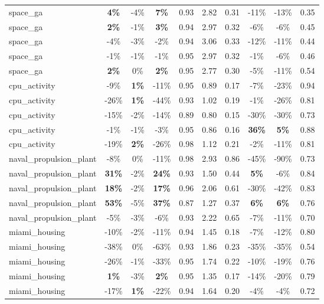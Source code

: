 \begin{table}[!htbp]
\begin{small}
\begin{sc}
{\begin{tabular}{lccccccccc}
space\_ga & \textbf{4\%} & -4\% & \textbf{7\%} & 0.93 & 2.82 & 0.31 & -11\% & -13\% & 0.35 \\
space\_ga & \textbf{2\%} & -1\% & \textbf{3\%} & 0.94 & 2.97 & 0.32 & -6\% & -6\% & 0.45 \\
space\_ga & -4\% & -3\% & -2\% & 0.94 & 3.06 & 0.33 & -12\% & -11\% & 0.44 \\
space\_ga & -1\% & -1\% & -1\% & 0.95 & 2.97 & 0.32 & -1\% & -6\% & 0.46 \\
space\_ga & \textbf{2\%} & 0\% & \textbf{2\%} & 0.95 & 2.77 & 0.30 & -5\% & -11\% & 0.54 \\
cpu\_activity & -9\% & \textbf{1\%} & -11\% & 0.95 & 0.89 & 0.17 & -7\% & -23\% & 0.94 \\
cpu\_activity & -26\% & \textbf{1\%} & -44\% & 0.93 & 1.02 & 0.19 & -1\% & -26\% & 0.81 \\
cpu\_activity & -15\% & -2\% & -14\% & 0.89 & 0.80 & 0.15 & -30\% & -30\% & 0.73 \\
cpu\_activity & -1\% & -1\% & -3\% & 0.95 & 0.86 & 0.16 & \textbf{36\%} & \textbf{5\%} & 0.88 \\
cpu\_activity & -19\% & \textbf{2\%} & -26\% & 0.98 & 1.12 & 0.21 & -2\% & -11\% & 0.81 \\
naval\_propulsion\_plant & -8\% & 0\% & -11\% & 0.98 & 2.93 & 0.86 & -45\% & -90\% & 0.73 \\
naval\_propulsion\_plant & \textbf{31\%} & -2\% & \textbf{24\%} & 0.93 & 1.50 & 0.44 & \textbf{5\%} & -6\% & 0.84 \\
naval\_propulsion\_plant & \textbf{18\%} & -2\% & \textbf{17\%} & 0.96 & 2.06 & 0.61 & -30\% & -42\% & 0.83 \\
naval\_propulsion\_plant & \textbf{53\%} & -5\% & \textbf{37\%} & 0.87 & 1.27 & 0.37 & \textbf{6\%} & \textbf{6\%} & 0.76 \\
naval\_propulsion\_plant & -5\% & -3\% & -6\% & 0.93 & 2.22 & 0.65 & -7\% & -11\% & 0.70 \\
miami\_housing & -10\% & -2\% & -11\% & 0.94 & 1.45 & 0.18 & -7\% & -12\% & 0.80 \\
miami\_housing & -38\% & 0\% & -63\% & 0.93 & 1.86 & 0.23 & -35\% & -35\% & 0.54 \\
miami\_housing & -26\% & -1\% & -33\% & 0.95 & 1.74 & 0.22 & -10\% & -19\% & 0.76 \\
miami\_housing & \textbf{1\%} & -3\% & \textbf{2\%} & 0.95 & 1.35 & 0.17 & -14\% & -20\% & 0.79 \\
miami\_housing & -17\% & \textbf{1\%} & -22\% & 0.94 & 1.64 & 0.20 & -4\% & -4\% & 0.72 \\

\end{tabular}}
\end{sc}
\end{small}
\end{table}

